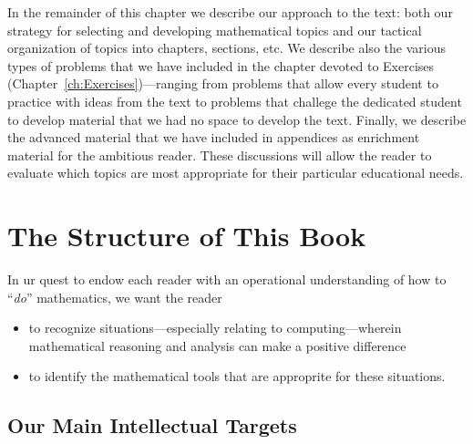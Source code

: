 \medskip

In the remainder of this chapter we describe our approach to the text:
both our strategy for selecting and developing mathematical topics and
our tactical organization of topics into chapters, sections, etc.  We
describe also the various types of problems that we have included in
the chapter devoted to Exercises
(Chapter~\ref{ch:Exercises})---ranging from problems that allow every
student to practice with ideas from the text to problems that challege
the dedicated student to develop material that we had no space to
develop the text.  Finally, we describe the advanced material that we
have included in appendices as enrichment material for the ambitious
reader.  These discussions will allow the reader to evaluate which
topics are most appropriate for their particular educational needs.



\section{The Structure of This Book}
\label{sec:thisbook}

In ur quest to endow each reader with an operational understanding of
how to ``{\em do}'' mathematics, we want the reader
\begin{itemize}
\item
to recognize situations---especially relating to computing---wherein
mathematical reasoning and analysis can make a positive difference
\item
to identify the mathematical tools that are approprite for these
situations.
\end{itemize}


\subsection{Our Main Intellectual Targets}
\label{sec:book-overwiew}

